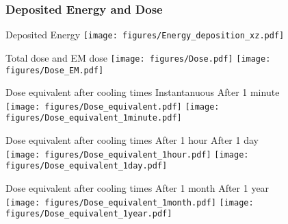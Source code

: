 \documentclass[xcolor={dvipsnames}]{beamer}
\begin{document}
\subsubsection{Deposited Energy and Dose}
\begin{frame}{Deposited Energy}
\centering
  \texttt{[image: figures/Energy\_deposition\_xz.pdf]}
\end{frame}
\begin{frame}{Total dose and EM dose}
\centering
  \texttt{[image: figures/Dose.pdf]}
  \texttt{[image: figures/Dose\_EM.pdf]}
\end{frame}
\begin{frame}{Dose equivalent after cooling times}
\centering
\hspace*{1.6cm} Instantanuous \hfill After 1 minute \hspace*{1.8cm} \\
  \texttt{[image: figures/Dose\_equivalent.pdf]}
  \texttt{[image: figures/Dose\_equivalent\_1minute.pdf]}
\end{frame}
\begin{frame}{Dose equivalent after cooling times}
\centering
\hspace*{1.6cm} After 1 hour \hfill After 1 day \hspace*{1.8cm} \\
  \texttt{[image: figures/Dose\_equivalent\_1hour.pdf]}
  \texttt{[image: figures/Dose\_equivalent\_1day.pdf]}
\end{frame}
\begin{frame}{Dose equivalent after cooling times}
\centering
\hspace*{1.6cm} After 1 month \hfill After 1 year \hspace*{1.8cm} \\
  \texttt{[image: figures/Dose\_equivalent\_1month.pdf]}
  \texttt{[image: figures/Dose\_equivalent\_1year.pdf]}
\end{frame}

\end{document}
